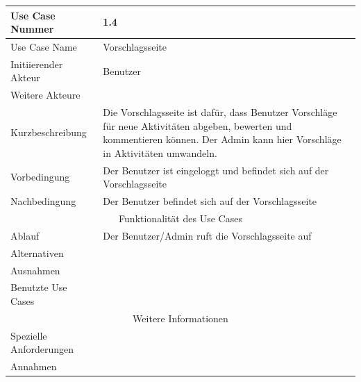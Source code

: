 \documentclass[10pt,a4paper]{article}
\begin{document}
\begin{tabular}{|l|p{.5\linewidth}|}
		\hline Use Case Nummer & 1.4\\ 
		\hline Use Case Name & Vorschlagsseite \\ 
		\hline Initiierender Akteur & Benutzer \\
		\hline Weitere Akteure & \\
		\hline Kurzbeschreibung & Die Vorschlagsseite ist dafür, dass Benutzer Vorschl\"age für neue Aktivit\"aten abgeben, bewerten und kommentieren k\"onnen. Der Admin kann hier Vorschl\"age in Aktivit\"aten umwandeln.\\
		\hline Vorbedingung & Der Benutzer ist eingeloggt und befindet sich auf der Vorschlagsseite \\
		\hline Nachbedingung & Der Benutzer befindet sich auf der Vorschlagsseite \\
		\hline \multicolumn{2}{|c|}{Funktionalität des Use Cases}\\
		\hline Ablauf & Der Benutzer/Admin ruft die Vorschlagsseite auf \\
		\hline Alternativen & \\
		\hline Ausnahmen & \\
		\hline Benutzte Use Cases & \\
		\hline \multicolumn{2}{|c|}{Weitere Informationen} \\
		\hline Spezielle Anforderungen & \\
		\hline Annahmen & \\
		\hline
	\end{tabular}
\end{document}
